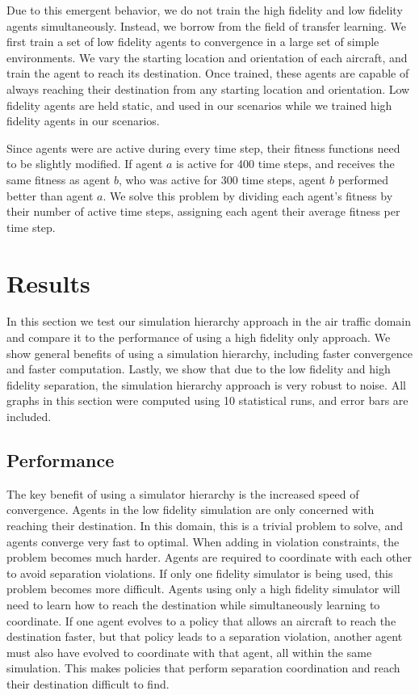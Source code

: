 \documentclass{sig-alternate}
\begin{document}
Due to this emergent behavior, we do not train the high fidelity and low fidelity agents simultaneously. Instead, we borrow from the field of transfer learning. We first train a set of low fidelity agents to convergence in a large set of simple environments. We vary the starting location and orientation of each aircraft, and train the agent to reach its destination. Once trained, these agents are capable of always reaching their destination from any starting location and orientation. Low fidelity agents are held static, and used in our scenarios while we trained high fidelity agents in our scenarios.

Since agents were are active during every time step, their fitness functions need to be slightly modified. If agent $a$ is active for 400 time steps, and receives the same fitness as agent $b$, who was active for 300 time steps, agent $b$ performed better than agent $a$. We solve this problem by dividing each agent's fitness by their number of active time steps, assigning each agent their average fitness per time step. 

\section{Results}

In this section we test our simulation hierarchy approach in the air traffic domain and compare it to the performance of using a high fidelity only approach. We show general benefits of using a simulation hierarchy, including faster convergence and faster computation. Lastly, we show that due to the low fidelity and high fidelity separation, the simulation hierarchy approach is very robust to noise. All graphs in this section were computed using 10 statistical runs, and error bars are included.

\subsection{Performance}

The key benefit of using a simulator hierarchy is the increased speed of convergence. Agents in the low fidelity simulation are only concerned with reaching their destination. In this domain, this is a trivial problem to solve, and agents converge very fast to optimal. When adding in violation constraints, the problem becomes much harder. Agents are required to coordinate with each other to avoid separation violations. If only one fidelity simulator is being used, this problem becomes more difficult. Agents using only a high fidelity simulator will need to learn how to reach the destination while simultaneously learning to coordinate. If one agent evolves to a policy that allows an aircraft to reach the destination faster, but that policy leads to a separation violation, another agent must also have evolved to coordinate with that agent, all within the same simulation. This makes policies that perform separation coordination and reach their destination difficult to find. 
\end{document}
